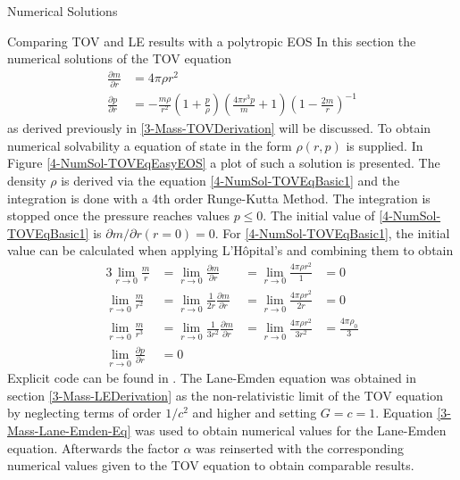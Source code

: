 \begin{section}{Numerical Solutions}
\begin{subsection}{Comparing TOV and LE results with a polytropic EOS}
In this section the numerical solutions of the TOV equation
\begin{align}
	\frac{\partial m}{\partial r} &= 4\pi\rho r^2\label{4-NumSol-TOVEqBasic1}\\
	\frac{\partial p}{\partial r} &=-\frac{m\rho}{r^2}\left(1+\frac{p}{\rho}\right)\left(\frac{4\pi r^3p}{m}+1\right)\left(1-\frac{2m}{r}\right)^{-1}
	\label{4-NumSol-TOVEqBasic2}
\end{align}
as derived previously in \ref{3-Mass-TOVDerivation} will be discussed. To obtain numerical solvability a equation of state in the form $\rho(r,p)$ is supplied. 
In Figure \ref{4-NumSol-TOVEqEasyEOS} a plot of such a solution is presented.
The density $\rho$ is derived via the equation \ref{4-NumSol-TOVEqBasic1} and the integration is done with a 4th order Runge-Kutta Method. The integration is stopped once the pressure reaches values $p\leq0$. The initial value of \ref{4-NumSol-TOVEqBasic1} is $\partial m/\partial r(r=0)=0$. For \ref{4-NumSol-TOVEqBasic1}, the initial value can be calculated when applying L'Hôpital's and combining them to obtain
\begin{alignat}{3}
	\lim\limits_{r\rightarrow0}\frac{m}{r} &= \lim\limits_{r\rightarrow0}\frac{\partial m}{\partial r} &=\lim\limits_{r\rightarrow0}\frac{4\pi\rho r^2}{1} &= 0\\
	\lim\limits_{r\rightarrow0}\frac{m}{r^2} &= \lim\limits_{r\rightarrow0}\frac{1}{2r}\frac{\partial m}{\partial r}  &= \lim\limits_{r\rightarrow0}\frac{4\pi\rho r^2}{2r} &= 0\\
	\lim\limits_{r\rightarrow0}\frac{m}{r^3} &= \lim\limits_{r\rightarrow0}\frac{1}{3r^2}\frac{\partial m}{\partial r} &=\lim\limits_{r\rightarrow0}\frac{4\pi\rho r^2}{3r^2} &= \frac{4\pi\rho_0}{3}\\
	\lim\limits_{r\rightarrow0}\frac{\partial p}{\partial r} &= 0
\end{alignat}
Explicit code can be found in \cite{pleyerGithubRepositoryJonas}. The Lane-Emden equation was obtained in section \ref{3-Mass-LEDerivation} as the non-relativistic limit of the TOV equation by neglecting terms of order $1/c^2$ and higher and setting $G=c=1$. Equation \ref{3-Mass-Lane-Emden-Eq} was used to obtain numerical values for the Lane-Emden equation. Afterwards the factor $\alpha$ was reinserted with the corresponding numerical values given to the TOV equation to obtain comparable results.

\end{subsection}
\end{section}
